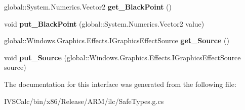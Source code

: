 \begin{DoxyCompactItemize}
global\+::\+System.\+Numerics.\+Vector2 {\bfseries get\+\_\+\+Black\+Point} ()
\item 
\mbox{\label{interface_microsoft_1_1_graphics_1_1_canvas_1_1_effects_1_1_i_brightness_effect_afe239defd7c9c83a318e6b02fae24e20}} 
void {\bfseries put\+\_\+\+Black\+Point} (global\+::\+System.\+Numerics.\+Vector2 value)
\item 
\mbox{\label{interface_microsoft_1_1_graphics_1_1_canvas_1_1_effects_1_1_i_brightness_effect_abf9e5eb7f7c91f123aa441a7dd92ada3}} 
global\+::\+Windows.\+Graphics.\+Effects.\+I\+Graphics\+Effect\+Source {\bfseries get\+\_\+\+Source} ()
\item 
\mbox{\label{interface_microsoft_1_1_graphics_1_1_canvas_1_1_effects_1_1_i_brightness_effect_a30f90f5f327a749696e5c3766535368e}} 
void {\bfseries put\+\_\+\+Source} (global\+::\+Windows.\+Graphics.\+Effects.\+I\+Graphics\+Effect\+Source source)
\end{DoxyCompactItemize}


The documentation for this interface was generated from the following file\+:\begin{DoxyCompactItemize}
\item 
I\+V\+S\+Calc/bin/x86/\+Release/\+A\+R\+M/ilc/Safe\+Types.\+g.\+cs\end{DoxyCompactItemize}
